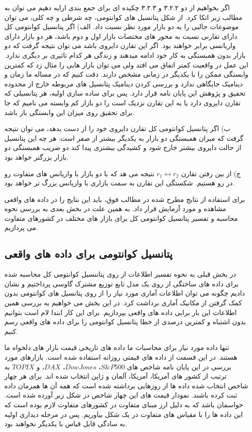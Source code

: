 \documentclass[a4paper,titlepage,12pt,fleqn,oneside]{report}
\begin{document}
اگر بخواهیم از دو ۳.۲.۲ و ۳.۲.۳ چکیده ای برای جمع بندی ارايه دهیم می توان به مطالب زیر اتکا کرد.
از شکل پتانسیل های کوانتومی، چه شرطی و چه کلی، می توان موضوعات جالبی را به دو بازار مورد نظر نسبت داد. 
الف) اگر پتانسیل کوانتومی کل دارای تقارنی نسبت به محور های مختصات بازار اول و دوم باشد، هر دو بازار دارای واریانسی برابر خواهند بود. اگر این تقارن دایروی باشد می توان نتیجه گرفت که دو بازار بدون همبستگی به کار خود ادامه  میدهند و زندگی هر کدام تاثیری بر دیگری ندارد. این عمل در واقعیت کمتر اتفاق می افتد ولی می توان بازار هایی را مثال زد که کمترین وابستگی ممکن را با یکدیگر در زمانی مشخص دارند. دقت کنیم که در مساله ما زمان و دینامیک جایگاهی ندارد و بررسی کردن دینامیک پتانسیل های مربوطه خارج از محدوده تحقیق و پژوهش این پایان نامه قرار دارد. پس برای ساده سازی اولیه، هر پتانسیلی که تقارن دایروی دارد یا به این تقارن نزدیک است را دو بازار کم وابسته می نامیم که جا برای تحقیق روی میزان این وابستگی باز باشد. 

ب) اگر پتانسیل کوانتومی کل تقارن دایروی خود را از دست بدهد، می توان نتیجه گرفت که میزان همبستگی دو بازار به یکدیگر بیشتر از صفر است. هر چه این پتانسیل از حالت دایروی بیشتر خارج شود و کشیدگی بیشتری پیدا کند دو ضریب همبستگی دو بازار بزرگتر خواهد بود. 

ج) از بین رفتن تقارن 
$r_1 \leftrightarrow r_2$
نتیجه می هد که با دو بازار با واریانس های متفاوت رو در رو هستیم. شکستگی این تقارن به سمت بازاری با واریانس بزرگ تر خواهد بود. 

برای استفاده از نتایج مطرح شده در مطالب فوق، باید این نتایج را در داده های واقعی مشاهده و مورد آزمایش قرار داد. به همین علت در بخش بعدی به بررسی نحوه محاسبه و تفسیر پتانسیل کوانتومی کل برای بازار های مختلف در کشورهای متفاوت می پردازیم. 
\newpage
\subsection{پتانسیل کوانتومی برای داده های واقعی}
در بخش قبلی به نحوه تفسیر اطلاعات از روی پتاننسیل کوانتومی کل محاسبه شده برای داده های ساختگی از روی یک مدل تابع توزیع مشترک گاوسی پرداختیم و نشان دادیم چگونه می توان اطلاعات آماری مورد نیاز را از روی پتانسیل های کوانتومی بدون کمک گرفتن از مکانیک آماری برداشت کرد. در این بخش می خواهیم به بررسی همین اطلاعات این بار برایی داده های واقعی بپردازیم. برای این کار ابتدا لام است بتوانیم بدون اشتباه و کمترین درصدی از خطا پتانسیل کوانتومی را برای داده های واقعی رسم کنیم. 

تنها داده مورد نیاز برای محاسبات ما داده های تاریخی قیمت بازار های دلخواه ما هستند. در این قسمت از داده های قیمتی روزانه استفاده شده است. بازارهای مورد بررسی در این پایان نامه شاخص های 
$S\&P500$، 
$Dow Jones$، 
$DAX$،
و 
$TOPIX$
 به ترتیب از کشور های آمریکا، آمریکا، آلمان و ژاپن انتخاب شده اند. برای هر چهار شاخص انتخاب شده داده ها از روزهایی برداشته شده است که همه آن ها همزمان داده ثبت کرده باشند. نمودار قیمت های این چهار شاخص در شکل زیر آورده شده است. حواسمان باشد که به دلیل ارز مبنای متفاوت در کشورهای متفاوت لازم بوده است که این داده ها را با مقیاس های متفاوت در یک شکل بیاوریم. پس در مرحله دیداری اولیه به سادگی قابل قیاس با یکدیگر نخواهند بود. 
 
\end{document}
